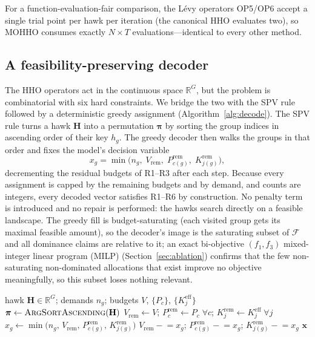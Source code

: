\documentclass[runningheads]{llncs}
\begin{document}
For a function-evaluation-fair comparison, the Lévy operators OP5/OP6 accept a single trial point per hawk per iteration (the canonical HHO evaluates two), so MOHHO consumes exactly $N\times T$ evaluations---identical to every other method.

\subsection{A feasibility-preserving decoder}
\label{sec:decoder}

The HHO operators act in the continuous space $\mathbb{R}^{G}$, but the problem is combinatorial with six hard constraints. We bridge the two with the SPV rule~\cite{bean} followed by a deterministic greedy assignment (Algorithm~\ref{alg:decode}). The SPV rule turns a hawk $\mathbf{H}$ into a permutation $\boldsymbol{\pi}$ by sorting the group indices in ascending order of their key $h_g$. The greedy decoder then walks the groups in that order and fixes the model's decision variable
\begin{equation}
x_g = \min\!\bigl(n_g,\; V_{\text{rem}},\; P^{\text{rem}}_{c(g)},\; K^{\text{rem}}_{j(g)}\bigr),
\label{eq:greedy}
\end{equation}
decrementing the residual budgets of R1--R3 after each step. Because every assignment is capped by the remaining budgets and by demand, and counts are integers, every decoded vector satisfies R1--R6 by construction. No penalty term is introduced and no repair is performed: the hawks search directly on a feasible landscape. The greedy fill is budget-saturating (each visited group gets its maximal feasible amount), so the decoder's image is the saturating subset of $\mathcal{F}$ and all dominance claims are relative to it; an exact bi-objective $(f_1,f_3)$ mixed-integer linear program (MILP) (Section~\ref{sec:ablation}) confirms that the few non-saturating non-dominated allocations that exist improve no objective meaningfully, so this subset loses nothing relevant.

\begin{algorithm}[t]
\caption{Feasibility-preserving SPV + greedy decoder}
\label{alg:decode}
\begin{algorithmic}[1]
\Require hawk $\mathbf{H}\in\mathbb{R}^{G}$; demands $n_g$; budgets $V$, $\{P_c\}$, $\{K_j^{\text{eff}}\}$
\State $\boldsymbol{\pi} \gets \textsc{ArgSortAscending}(\mathbf{H})$ 
\State $V_{\text{rem}} \gets V$;\; $P^{\text{rem}}_c \gets P_c\;\forall c$;\; $K^{\text{rem}}_j \gets K_j^{\text{eff}}\;\forall j$
 
  \State $x_g \gets \min\bigl(n_g,\, V_{\text{rem}},\, P^{\text{rem}}_{c(g)},\, K^{\text{rem}}_{j(g)}\bigr)$
  \State $V_{\text{rem}} \mathrel{-}= x_g$;\; $P^{\text{rem}}_{c(g)} \mathrel{-}= x_g$;\; $K^{\text{rem}}_{j(g)} \mathrel{-}= x_g$
\EndFor
\State \Return $\mathbf{x}$ 
\end{algorithmic}
\end{algorithm}
\end{document}
